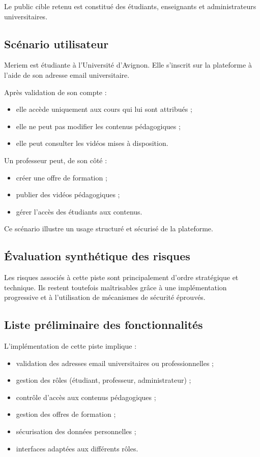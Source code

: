 \documentclass[12pt,a4paper]{report}
\begin{document}
Le public cible retenu est constitué des étudiants, enseignants et administrateurs
universitaires.

\subsection{Scénario utilisateur}

Meriem est étudiante à l’Université d’Avignon.
Elle s’inscrit sur la plateforme à l’aide de son adresse email universitaire.

Après validation de son compte :
\begin{itemize}
  \item elle accède uniquement aux cours qui lui sont attribués ;
  \item elle ne peut pas modifier les contenus pédagogiques ;
  \item elle peut consulter les vidéos mises à disposition.
\end{itemize}

Un professeur peut, de son côté :
\begin{itemize}
  \item créer une offre de formation ;
  \item publier des vidéos pédagogiques ;
  \item gérer l’accès des étudiants aux contenus.
\end{itemize}

Ce scénario illustre un usage structuré et sécurisé de la plateforme.

\subsection{Évaluation synthétique des risques}

Les risques associés à cette piste sont principalement d’ordre stratégique et
technique.
Ils restent toutefois maîtrisables grâce à une implémentation progressive et à
l’utilisation de mécanismes de sécurité éprouvés.

\subsection{Liste préliminaire des fonctionnalités}

L’implémentation de cette piste implique :
\begin{itemize}
  \item validation des adresses email universitaires ou professionnelles ;
  \item gestion des rôles (étudiant, professeur, administrateur) ;
  \item contrôle d’accès aux contenus pédagogiques ;
  \item gestion des offres de formation ;
  \item sécurisation des données personnelles ;
  \item interfaces adaptées aux différents rôles.
\end{itemize}
\end{document}
